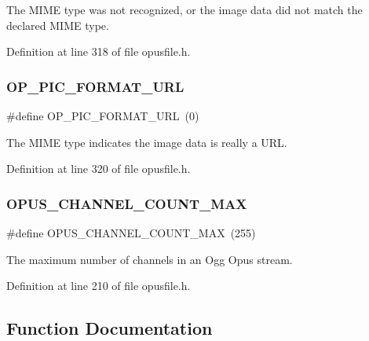 The M\+I\+ME type was not recognized, or the image data did not match the declared M\+I\+ME type. 

Definition at line 318 of file opusfile.\+h.

\mbox{\label{group__header__info_gaac4ef30a33caf090b9b1a5ada8f48204}} 
\subsubsection{\texorpdfstring{OP\_PIC\_FORMAT\_URL}{OP\_PIC\_FORMAT\_URL}}
{\footnotesize\ttfamily \#define O\+P\+\_\+\+P\+I\+C\+\_\+\+F\+O\+R\+M\+A\+T\+\_\+\+U\+RL~(0)}

The M\+I\+ME type indicates the image data is really a U\+RL. 

Definition at line 320 of file opusfile.\+h.

\mbox{\label{group__header__info_gad6f0329582430a828244045ac85a5417}} 
\subsubsection{\texorpdfstring{OPUS\_CHANNEL\_COUNT\_MAX}{OPUS\_CHANNEL\_COUNT\_MAX}}
{\footnotesize\ttfamily \#define O\+P\+U\+S\+\_\+\+C\+H\+A\+N\+N\+E\+L\+\_\+\+C\+O\+U\+N\+T\+\_\+\+M\+AX~(255)}

The maximum number of channels in an Ogg Opus stream. 

Definition at line 210 of file opusfile.\+h.



\subsection{Function Documentation}
\mbox{\label{group__header__info_gaac9c6e1916fba6e53152b936055d3db0}} 
